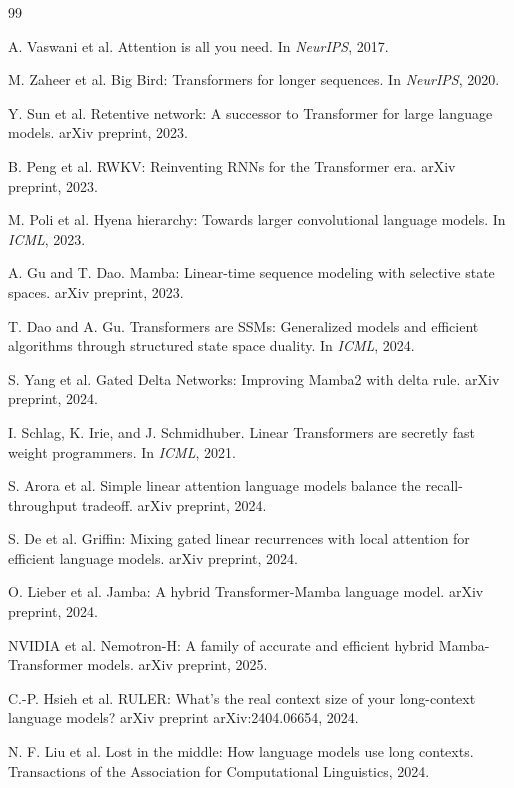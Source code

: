 \documentclass[10pt]{article}
\begin{document}
\begin{thebibliography}{99}

A. Vaswani et al.
\newblock Attention is all you need.
\newblock In \emph{NeurIPS}, 2017.

M. Zaheer et al.
\newblock Big Bird: Transformers for longer sequences.
\newblock In \emph{NeurIPS}, 2020.

Y. Sun et al.
\newblock Retentive network: A successor to Transformer for large language
models.
\newblock arXiv preprint, 2023.

B. Peng et al.
\newblock RWKV: Reinventing RNNs for the Transformer era.
\newblock arXiv preprint, 2023.

M. Poli et al.
\newblock Hyena hierarchy: Towards larger convolutional language models.
\newblock In \emph{ICML}, 2023.

A. Gu and T. Dao.
\newblock Mamba: Linear-time sequence modeling with selective state spaces.
\newblock arXiv preprint, 2023.

T. Dao and A. Gu.
\newblock Transformers are SSMs: Generalized models and efficient algorithms
through structured state space duality.
\newblock In \emph{ICML}, 2024.

S. Yang et al.
\newblock Gated Delta Networks: Improving Mamba2 with delta rule.
\newblock arXiv preprint, 2024.

I. Schlag, K. Irie, and J. Schmidhuber.
\newblock Linear Transformers are secretly fast weight programmers.
\newblock In \emph{ICML}, 2021.

S. Arora et al.
\newblock Simple linear attention language models balance the recall-throughput
tradeoff.
\newblock arXiv preprint, 2024.

S. De et al.
\newblock Griffin: Mixing gated linear recurrences with local attention for
efficient language models.
\newblock arXiv preprint, 2024.

O. Lieber et al.
\newblock Jamba: A hybrid Transformer-Mamba language model.
\newblock arXiv preprint, 2024.

NVIDIA et al.
\newblock Nemotron-H: A family of accurate and efficient hybrid
Mamba-Transformer models.
\newblock arXiv preprint, 2025.

C.-P. Hsieh et al.
\newblock RULER: What's the real context size of your long-context language
models?
\newblock arXiv preprint arXiv:2404.06654, 2024.

N. F. Liu et al.
\newblock Lost in the middle: How language models use long contexts.
\newblock Transactions of the Association for Computational Linguistics, 2024.

\end{thebibliography}
\end{document}
